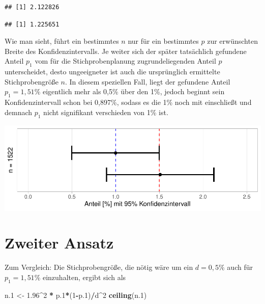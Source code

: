 \documentclass[
]{article}
\newenvironment{Shaded}{\begin{snugshade}}{\end{snugshade}}
\newcommand{\CommentTok}[1]{\textcolor[rgb]{0.56,0.35,0.01}{\textit{#1}}}
\newcommand{\DecValTok}[1]{\textcolor[rgb]{0.00,0.00,0.81}{#1}}
\newcommand{\FloatTok}[1]{\textcolor[rgb]{0.00,0.00,0.81}{#1}}
\newcommand{\KeywordTok}[1]{\textcolor[rgb]{0.13,0.29,0.53}{\textbf{#1}}}
\newcommand{\NormalTok}[1]{#1}
\newcommand{\OperatorTok}[1]{\textcolor[rgb]{0.81,0.36,0.00}{\textbf{#1}}}
\newcommand{\StringTok}[1]{\textcolor[rgb]{0.31,0.60,0.02}{#1}}
\begin{document}
\begin{verbatim}
## [1] 2.122826
\end{verbatim}

\begin{Shaded}
\end{Shaded}

\begin{verbatim}
## [1] 1.225651
\end{verbatim}

Wie man sieht, führt ein bestimmtes \(n\) nur für ein bestimmtes \(p\)
zur erwünschten Breite des Konfidenzintervalls. Je weiter sich der
später tatsächlich gefundene Anteil \(p_1\) vom für die
Stichprobenplanung zugrundeliegenden Anteil \(p\) unterscheidet, desto
ungeeigneter ist auch die ursprünglich ermittelte Stichprobengröße
\(n\). In diesem speziellen Fall, liegt der gefundene Anteil
\(p_1=1,51\%\) eigentlich mehr als 0,5\% über den 1\%, jedoch beginnt
sein Konfidenzintervall schon bei 0,897\%, sodass es die 1\% noch mit
einschließt und demnach \(p_1\) nicht signifikant verschieden von 1\%
ist.

\begin{center}\includegraphics{stat_samplesize_files/figure-latex/unnamed-chunk-11-1} \end{center}

\hypertarget{zweiter-ansatz}{%
\section{Zweiter Ansatz}\label{zweiter-ansatz}}

Zum Vergleich: Die Stichprobengröße, die nötig wäre um ein \(d=0,5\%\)
auch für \(p_1=1,51\%\) einzuhalten, ergibt sich als

\begin{Shaded}
\begin{Highlighting}[]
\NormalTok{n}\FloatTok{.1}\NormalTok{ <-}\StringTok{ }\FloatTok{1.96}\OperatorTok{^}\DecValTok{2} \OperatorTok{*}\StringTok{ }\NormalTok{p}\FloatTok{.1}\OperatorTok{*}\NormalTok{(}\DecValTok{1}\OperatorTok{-}\NormalTok{p}\FloatTok{.1}\NormalTok{)}\OperatorTok{/}\NormalTok{d}\OperatorTok{^}\DecValTok{2}
\KeywordTok{ceiling}\NormalTok{(n}\FloatTok{.1}\NormalTok{)}
\end{Highlighting}
\end{Shaded}
\end{document}
